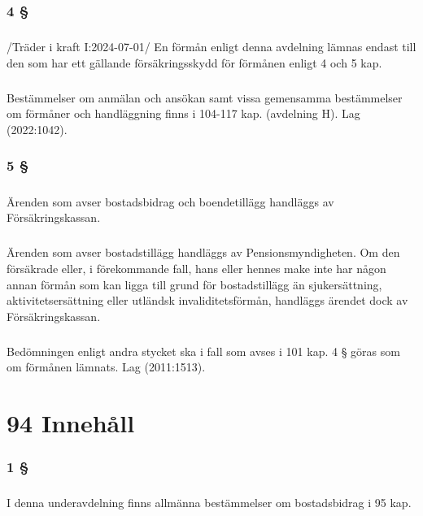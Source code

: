 \documentclass[a4paper,notitlepage,openany,10pt]{book}
\begin{document}
\subsection*{4 §}
\paragraph*{}
/Träder i kraft I:2024-07-01/
En förmån enligt denna avdelning lämnas endast till den som har ett gällande försäkringsskydd för förmånen enligt 4 och 5 kap.
\paragraph*{}
Bestämmelser om anmälan och ansökan samt vissa gemensamma bestämmelser om förmåner och handläggning finns i 104-117 kap. (avdelning H).
Lag (2022:1042).
\subsection*{5 §}
\paragraph*{}
Ärenden som avser bostadsbidrag och boendetillägg handläggs av Försäkringskassan.
\paragraph*{}
Ärenden som avser bostadstillägg handläggs av Pensionsmyndigheten. Om den försäkrade eller, i förekommande fall, hans eller hennes make inte har någon annan förmån som kan ligga till grund för bostadstillägg än sjukersättning, aktivitetsersättning eller utländsk invaliditetsförmån, handläggs ärendet dock av Försäkringskassan.
\paragraph*{}
Bedömningen enligt andra stycket ska i fall som avses i 101 kap. 4 § göras som om förmånen lämnats.
Lag (2011:1513).
\chapter*{94 Innehåll}
\subsection*{1 §}
\paragraph*{}
I denna underavdelning finns allmänna bestämmelser om bostadsbidrag i 95 kap.
\end{document}
